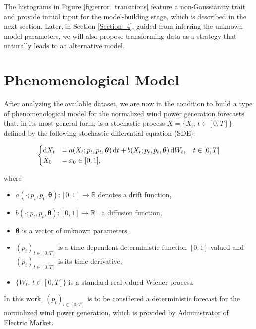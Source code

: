 \documentclass[11pt]{article}
\theoremstyle{definition}
\begin{document}
The histograms in Figure \ref{fig:error_transitions} feature a non-Gaussianity trait and provide initial input for the model-building stage, which is described in the next section.
Later, in Section \ref{Section_4}, guided from inferring the unknown model parameters, we will also propose transforming data as a strategy that naturally leads to an alternative model.



\section{Phenomenological  Model} \label{Section_3}

After analyzing the available dataset, we are now in the condition to build a type of phenomenological model for the normalized wind power generation forecasts that, in its most general form, is a stochastic process $X = \{X_t, \, t \in [0, T] \}$  defined by the following stochastic differential equation (SDE):

\begin{equation}
\begin{cases}
    \dif X_t &=  a(X_t; p_t, \dot{p}_t,\bm{\theta})\dif t + b (X_t; p_t, \dot{p}_t, \bm{\theta} )\dif W_t, \quad t \in [0,T]  \\
     X_0  &=  x_0 \in [0,1],
\end{cases}
 \label{eq:main}
\end{equation} 

where

\begin{itemize}
\item $a(\cdot; p_t, \dot{p}_t, \bm{\theta}): [0,1] \to \mathbb{R} $  denotes a drift function,
\item $b(\cdot; p_t, \dot{p}_t, \bm{\theta}): [0,1] \to \mathbb{R}^+ $  a  diffusion function,
\item $\bm{\theta}$ is a vector of unknown parameters,
\item $(p_t)_{t \in [0,T]}$ is a time-dependent deterministic function $[0,1]$-valued and $ (\dot{p}_t)_{t \in [0,T]}$ is its time derivative,
\item $\{W_t, \, t \in [0,T] \}$ is a standard real-valued Wiener process.
\end{itemize}

In this work, $(p_t)_{t \in [0,T]}$ is to be considered a deterministic forecast for the normalized wind power generation, which is provided by Administrator of Electric Market. 
\end{document}
